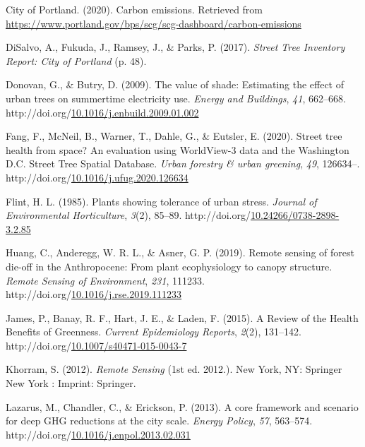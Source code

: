 \documentclass[12pt,twoside]{reedthesis}
\newlength{\cslhangindent}
\newenvironment{CSLReferences}[2] %
 {%
  \setlength{\parindent}{0pt}
  \ifodd #1 \everypar{\setlength{\hangindent}{\cslhangindent}}\ignorespaces\fi
  \ifnum #2 > 0
  \setlength{\parskip}{#2\baselineskip}
  \fi
 }%
 {}
\begin{document}
\begin{CSLReferences}{1}{0}
\leavevmode{}%
City of Portland. (2020). Carbon emissions. Retrieved from \url{https://www.portland.gov/bps/scg/scg-dashboard/carbon-emissions}

\leavevmode{}%
DiSalvo, A., Fukuda, J., Ramsey, J., \& Parks, P. (2017). \emph{Street Tree Inventory Report: City of Portland} (p. 48).

\leavevmode{}%
Donovan, G., \& Butry, D. (2009). The value of shade: Estimating the effect of urban trees on summertime electricity use. \emph{Energy and Buildings}, \emph{41}, 662--668. http://doi.org/\href{https://doi.org/10.1016/j.enbuild.2009.01.002}{10.1016/j.enbuild.2009.01.002}

\leavevmode{}%
Fang, F., McNeil, B., Warner, T., Dahle, G., \& Eutsler, E. (2020). Street tree health from space? An evaluation using WorldView-3 data and the Washington D.C. Street Tree Spatial Database. \emph{Urban forestry \& urban greening}, \emph{49}, 126634--. http://doi.org/\href{https://doi.org/10.1016/j.ufug.2020.126634}{10.1016/j.ufug.2020.126634}

\leavevmode{}%
Flint, H. L. (1985). Plants showing tolerance of urban stress. \emph{Journal of Environmental Horticulture}, \emph{3}(2), 85--89. http://doi.org/\href{https://doi.org/10.24266/0738-2898-3.2.85}{10.24266/0738-2898-3.2.85}

\leavevmode{}%
Huang, C., Anderegg, W. R. L., \& Asner, G. P. (2019). Remote sensing of forest die-off in the Anthropocene: From plant ecophysiology to canopy structure. \emph{Remote Sensing of Environment}, \emph{231}, 111233. http://doi.org/\href{https://doi.org/10.1016/j.rse.2019.111233}{10.1016/j.rse.2019.111233}

\leavevmode{}%
James, P., Banay, R. F., Hart, J. E., \& Laden, F. (2015). A Review of the Health Benefits of Greenness. \emph{Current Epidemiology Reports}, \emph{2}(2), 131--142. http://doi.org/\href{https://doi.org/10.1007/s40471-015-0043-7}{10.1007/s40471-015-0043-7}

\leavevmode{}%
Khorram, S. (2012). \emph{Remote Sensing} (1st ed. 2012.). New York, NY: Springer New York : Imprint: Springer.

\leavevmode{}%
Lazarus, M., Chandler, C., \& Erickson, P. (2013). A core framework and scenario for deep GHG reductions at the city scale. \emph{Energy Policy}, \emph{57}, 563--574. http://doi.org/\href{https://doi.org/10.1016/j.enpol.2013.02.031}{10.1016/j.enpol.2013.02.031}


\end{CSLReferences}
\end{document}
